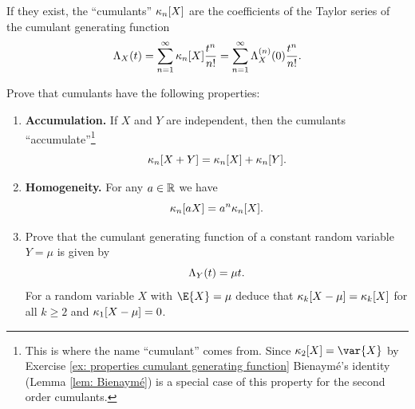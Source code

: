 \begin{definition}[Cumulants]
    If they exist, the ``cumulants'' \(\kappa_n[X]\) are the coefficients of the Taylor
    series of the cumulant generating function
    \[
        \Lambda_X(t)
        = \sum_{n=1}^\infty \kappa_n[X]\frac{t^n}{n!}
        = \sum_{n=1}^\infty \Lambda_X^{(n)}(0) \frac{t^n}{n!}.
    \]
\end{definition}

\begin{exercise}[subtitle={Properties of cumulants \Coffeecup}]
    \label{ex: properties cumulants}
    Prove that cumulants have the following properties: 
    \begin{enumerate}[label=(\alph*), noitemsep]
        \item\label{it: (cumulants) accumulate} \textbf{Accumulation.}
        If \(X\) and \(Y\) are independent, then
        the cumulants ``accumulate''\footnote{
            This is where the name ``cumulant'' comes from. Since
            \(\cumulant_2[X] = \var{X}\) by Exercise \ref{ex: properties cumulant
            generating function} Bienaymé's identity (Lemma \ref{lem: Bienaymé})
            is a special case of this property for the second order cumulants.
        }
        \[
            \kappa_n[X+Y] = \kappa_n[X] + \kappa_n[Y].
        \]

        \item\label{it: (cumulants) homogeneity}\textbf{Homogeneity.} For any \(a \in \mathbb{R}\) we have
        \[
            \kappa_n[aX] = a^n \kappa_n[X].
        \]

        \item\label{it: (cumulants) constant} Prove that the cumulant generating function of a constant random variable \(Y=\mu\)
        is given by
        \[
            \Lambda_Y(t) = \mu t.
        \]
        For a random variable \(X\) with \(\E{X} = \mu\) deduce that
        \(\kappa_k[X-\mu] = \kappa_k[X]\) for all \(k \ge 2\) and
        \(\kappa_1[X-\mu]=0\).
    \end{enumerate}
\end{exercise}


